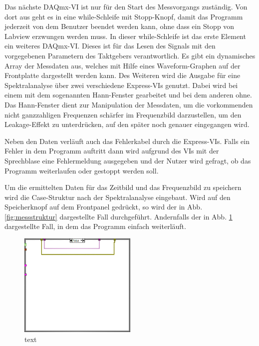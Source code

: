 		Das nächste DAQmx-VI ist nur für den Start des Messvorgangs zuständig.
		Von dort aus geht es in eine while-Schleife mit Stopp-Knopf, damit das Programm jederzeit von dem Benutzer beendet werden kann, ohne dass ein Stopp von Labview erzwungen werden muss.
		In dieser while-Schleife ist das erste Element ein weiteres DAQmx-VI.
		Dieses ist für das Lesen des Signals mit den vorgegebenen Parametern des Taktgebers verantwortlich.
		Es gibt ein dynamisches Array der Messdaten aus, welches mit Hilfe eines Waveform-Graphen auf der Frontplatte dargestellt werden kann.  
		Des Weiteren wird die Ausgabe für eine Spektralanalyse über zwei verschiedene Express-VIs genutzt. 
		Dabei wird bei einem mit dem sogenannten Hann-Fenster gearbeitet und bei dem anderen ohne.
		Das Hann-Fenster dient zur Manipulation der Messdaten, um die vorkommenden nicht ganzzahligen Frequenzen schärfer im Frequenzbild darzustellen, um den Leakage-Effekt zu unterdrücken, auf den später noch genauer eingegangen wird.
		
		Neben den Daten verläuft auch das Fehlerkabel durch die Express-VIs. 
		Falls ein Fehler in dem Programm auftritt dann wird aufgrund des VIs mit der Sprechblase eine Fehlermeldung ausgegeben und der Nutzer wird gefragt, ob das Programm weiterlaufen oder gestoppt werden soll.
		
		Um die ermittelten Daten für das Zeitbild und das Frequenzbild zu speichern wird die Case-Struktur nach der Spektralanalyse eingebaut.
		Wird auf den Speicherknopf auf dem Frontpanel gedrückt, so wird der in Abb. \ref{fig:messstruktur} dargestellte Fall durchgeführt.
		Andernfalls der in Abb. \ref{fig:messstruktur_case} dargestellte Fall, in dem das Programm einfach weiterläuft.
		\begin{figure}[H]
			\centering
			\includegraphics[width=0.5\textwidth]{pic/messstruktur_case.png}	
			\caption{text}
			\label{fig:messstruktur_case}
		\end{figure}
	
